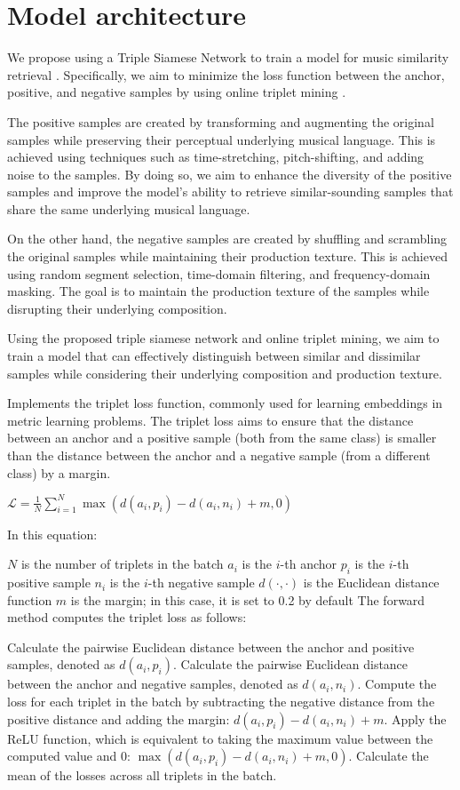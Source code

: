 \section{Model architecture}

We propose using a Triple Siamese Network to train a model for music similarity retrieval \cite{contentmusicsimtriplet2020}. Specifically, we aim to minimize the loss function between the anchor, positive, and negative samples by using online triplet mining \cite{Sikaroudi2020OfflinePatches}.

The positive samples are created by transforming and augmenting the original samples while preserving their perceptual underlying musical language. This is achieved using techniques such as time-stretching, pitch-shifting, and adding noise to the samples. By doing so, we aim to enhance the diversity of the positive samples and improve the model's ability to retrieve similar-sounding samples that share the same underlying musical language.

On the other hand, the negative samples are created by shuffling and scrambling the original samples while maintaining their production texture. This is achieved using random segment selection, time-domain filtering, and frequency-domain masking. The goal is to maintain the production texture of the samples while disrupting their underlying composition.

Using the proposed triple siamese network and online triplet mining, we aim to train a model that can effectively distinguish between similar and dissimilar samples while considering their underlying composition and production texture.

 Implements the triplet loss function, commonly used for learning embeddings in metric learning problems. The triplet loss aims to ensure that the distance between an anchor and a positive sample (both from the same class) is smaller than the distance between the anchor and a negative sample (from a different class) by a margin.

$\mathcal{L} = \frac{1}{N}\sum_{i=1}^{N} \max \left( d\left(a_i, p_i\right) - d\left(a_i, n_i\right) + m, 0 \right)$

In this equation:

$N$ is the number of triplets in the batch
$a_i$ is the $i$-th anchor
$p_i$ is the $i$-th positive sample
$n_i$ is the $i$-th negative sample
$d(\cdot, \cdot)$ is the Euclidean distance function
$m$ is the margin; in this case, it is set to 0.2 by default
The forward method computes the triplet loss as follows:

Calculate the pairwise Euclidean distance between the anchor and positive samples, denoted as $d(a_i, p_i)$.
Calculate the pairwise Euclidean distance between the anchor and negative samples, denoted as $d(a_i, n_i)$.
Compute the loss for each triplet in the batch by subtracting the negative distance from the positive distance and adding the margin: $d(a_i, p_i) - d(a_i, n_i) + m$.
Apply the ReLU function, which is equivalent to taking the maximum value between the computed value and 0: $\max \left( d(a_i, p_i) - d(a_i, n_i) + m, 0 \right)$.
Calculate the mean of the losses across all triplets in the batch.